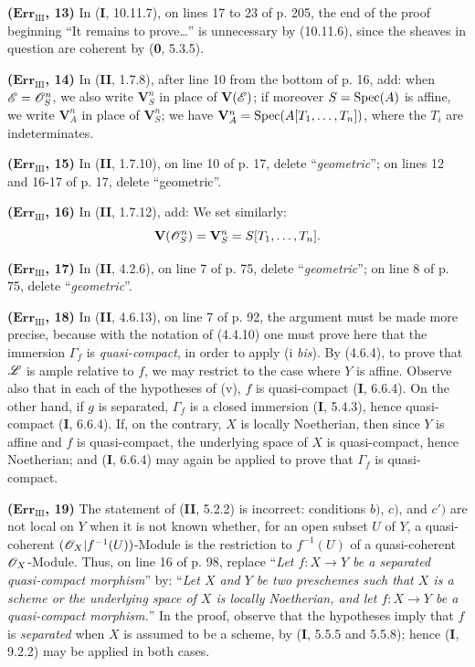\noindent\textbf{($\mathbf{Err}_{\mathrm{III}}$, 13)} In (\textbf{I}, 10.11.7), on
lines 17 to 23 of p. 205, the end of the proof beginning ``It remains to
prove\ldots{}'' is unnecessary by (10.11.6), since the sheaves in question
are coherent by (\textbf{0}, 5.3.5).

\noindent\textbf{($\mathbf{Err}_{\mathrm{III}}$, 14)} In (\textbf{II}, 1.7.8), after
line 10 from the bottom of p. 16, add: when $\mathscr{E}=\mathscr{O}_S^n$, we also write
$\mathbf V_S^n$ in place of $\mathbf V(\mathscr{E})$; if moreover $S=\operatorname{Spec}(A)$ is
affine, we write $\mathbf V_A^n$ in place of $\mathbf V_S^n$; we have
$\mathbf V_A^n=\operatorname{Spec}(A[T_1,\ldots,T_n])$, where the $T_i$ are indeterminates.

\noindent\textbf{($\mathbf{Err}_{\mathrm{III}}$, 15)} In (\textbf{II}, 1.7.10), on
line 10 of p. 17, delete ``\emph{geometric}''; on lines 12 and 16-17 of p.
17, delete ``geometric''.

\noindent\textbf{($\mathbf{Err}_{\mathrm{III}}$, 16)} In (\textbf{II}, 1.7.12), add:
We set similarly:
\[
  \mathbf V(\mathscr{O}_S^n)=\mathbf V_S^n=S[T_1,\ldots,T_n].
\]

\noindent\textbf{($\mathbf{Err}_{\mathrm{III}}$, 17)} In (\textbf{II}, 4.2.6), on
line 7 of p. 75, delete ``\emph{geometric}''; on line 8 of p. 75, delete
``\emph{geometric}''.

\noindent\textbf{($\mathbf{Err}_{\mathrm{III}}$, 18)} In (\textbf{II}, 4.6.13), on
line 7 of p. 92, the argument must be made more precise, because with the
notation of (4.4.10) one must prove here that the immersion $\Gamma_f$ is
\emph{quasi-compact}, in order to apply (i \emph{bis}). By (4.6.4), to prove that
$\mathscr{L}$ is ample relative to $f$, we may restrict to the case where $Y$ is
affine. Observe also that in each of the hypotheses of (v), $f$ is
quasi-compact (\textbf{I}, 6.6.4). On the other hand, if $g$ is
separated, $\Gamma_f$ is a closed immersion (\textbf{I}, 5.4.3), hence quasi-compact
(\textbf{I}, 6.6.4). If, on the contrary, $X$ is locally Noetherian, then since $Y$ is
affine and $f$ is quasi-compact, the underlying space of $X$ is quasi-compact,
hence Noetherian; and (\textbf{I}, 6.6.4) may again be applied to prove that $\Gamma_f$
is quasi-compact.

\noindent\textbf{($\mathbf{Err}_{\mathrm{III}}$, 19)} The statement of (\textbf{II},
5.2.2) is incorrect: conditions $b)$, $c)$, and $c')$ are not local on $Y$
when it is not known whether, for an open subset $U$ of $Y$, a quasi-coherent
$(\mathscr{O}_X|f^{-1}(U))$-Module is the restriction to $f^{-1}(U)$ of a
quasi-coherent $\mathscr{O}_X$-Module. Thus, on line 16 of p. 98, replace
``\emph{Let $f:X\to Y$ be a separated quasi-compact morphism}'' by:
``\emph{Let $X$ and $Y$ be two preschemes such that $X$ is a scheme or the
underlying space of $X$ is locally Noetherian, and let $f:X\to Y$ be a
quasi-compact morphism.}'' In the proof, observe that the hypotheses imply
that $f$ is \emph{separated} when $X$ is assumed to be a scheme, by (\textbf{I}, 5.5.5
and 5.5.8); hence (\textbf{I}, 9.2.2) may be applied in both cases.

